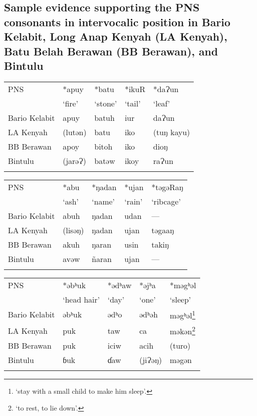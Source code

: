\documentclass[output=paper]{langscibook}
\begin{document}
\begin{paperappendix}
\section{Sample evidence supporting the PNS consonants in intervocalic position in Bario Kelabit, Long Anap Kenyah (LA Kenyah), Batu Belah Berawan (BB Berawan), and Bintulu}

\begin{tabularx}{\textwidth}{lXXXl}
\lsptoprule
PNS            & *apuy   & *batu   & *ikuR  &  *daɁun       \\
               & ‘fire’    & ‘stone’    & ‘tail’   & ‘leaf’          \\
\midrule
Bario Kelabit  &  apuy   &  batuh  &  iur   & daɁun         \\
LA Kenyah      & (lutən) &   batu  &  iko   & (tuŋ kayu)    \\
BB Berawan     & apoy    & bitoh   &  iko   & dioŋ          \\
Bintulu        & (jarəɁ) &   batəw &   ikoy &   raɁun       \\
\lspbottomrule
\end{tabularx}

\begin{tabularx}{\textwidth}{lXXXl}
\lsptoprule
PNS           & *abu  &  *ŋadan &   *ujan &  *təgəRaŋ \\
              & ‘ash’   &   ‘name’  &  ‘rain’   &‘ribcage’    \\
\midrule
Bario Kelabit &  abuh &   ŋadan &   udan  & ---     \\
LA Kenyah     &(lisəŋ)&    ŋadan&    ujan &  təgaaŋ   \\
BB Berawan    &  akuh &   ŋaran &   usin  & takiŋ     \\
Bintulu       &avəw   & ñaran   & ujan    & ---     \\
\lspbottomrule
\end{tabularx}

\begin{tabularx}{\textwidth}{lXXXl}
\lsptoprule
PNS            &  *əbʰuk   & *ədʰaw&    *əjʰa  &  *məgʰəl                                                         \\
               &  ‘head hair’&  ‘day’  &      ‘one’  &  ‘sleep’     \\
\midrule
Bario Kelabit  &  əbʰuk    &ədʰo   & ədʰəh     & məgʰəl\footnote{‘stay with a small child to make him sleep’.}    \\
LA Kenyah      &   puk     &taw     & ca        & məkən\footnote{‘to rest, to lie down’.}                          \\
BB Berawan     &   puk     &iciw    & acih      &(turo)                                                            \\
Bintulu        &   ɓuk     &ɗaw     &(jiɁəŋ)    & məgən\\
\lspbottomrule
\end{tabularx}


\end{paperappendix}
\end{document}
